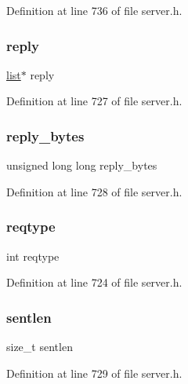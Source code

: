 Definition at line 736 of file server.\+h.

\mbox{\label{structclient_a3c5720baa890941d827d99224a615377}} 
\subsubsection{\texorpdfstring{reply}{reply}}
{\footnotesize\ttfamily \hyperlink{structlist}{list}$\ast$ reply}



Definition at line 727 of file server.\+h.

\mbox{\label{structclient_a89eaaab407b2e2659686c94683168b48}} 
\subsubsection{\texorpdfstring{reply\+\_\+bytes}{reply\_bytes}}
{\footnotesize\ttfamily unsigned long long reply\+\_\+bytes}



Definition at line 728 of file server.\+h.

\mbox{\label{structclient_a7c68e9e1d202efcb938b7527f7495de9}} 
\subsubsection{\texorpdfstring{reqtype}{reqtype}}
{\footnotesize\ttfamily int reqtype}



Definition at line 724 of file server.\+h.

\mbox{\label{structclient_a6a5253178e8e0d41fc9901e6b0626cae}} 
\subsubsection{\texorpdfstring{sentlen}{sentlen}}
{\footnotesize\ttfamily size\+\_\+t sentlen}



Definition at line 729 of file server.\+h.


